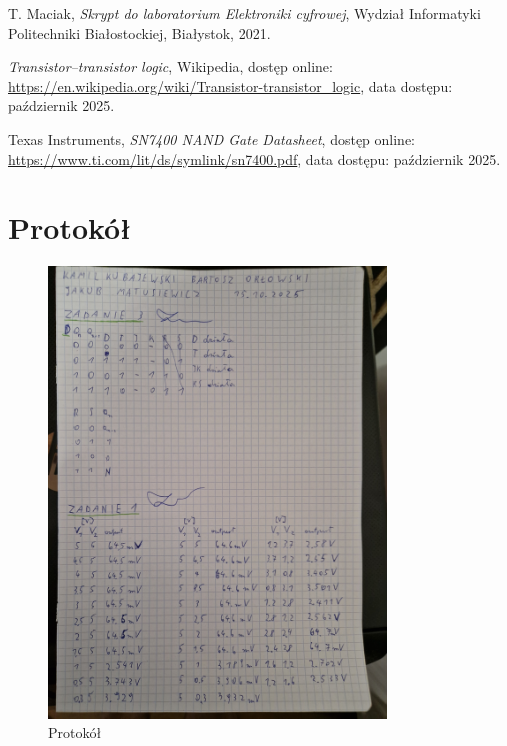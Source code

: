 \documentclass{article}
\begin{document}
\renewcommand{\refname}{}

\begin{thebibliography}{9}
	
	T. Maciak, \textit{Skrypt do laboratorium Elektroniki cyfrowej}, 
	Wydział Informatyki Politechniki Białostockiej, Białystok, 2021.
	
	\textit{Transistor–transistor logic}, Wikipedia, dostęp online: 
	\url{https://en.wikipedia.org/wiki/Transistor-transistor_logic}, 
	data dostępu: październik 2025.
	
	Texas Instruments, \textit{SN7400 NAND Gate Datasheet}, dostęp online: 
	\url{https://www.ti.com/lit/ds/symlink/sn7400.pdf}, 
	data dostępu: październik 2025.
	
\end{thebibliography}

\pagebreak
\section{Protokół}

\begin{figure}[h]
    \centering
    \includegraphics[width=0.8\textwidth, angle=-90]{protokol.JPG}
    \caption{Protokół}
    \label{fig:moj_obrazek}
\end{figure}
\end{document}
